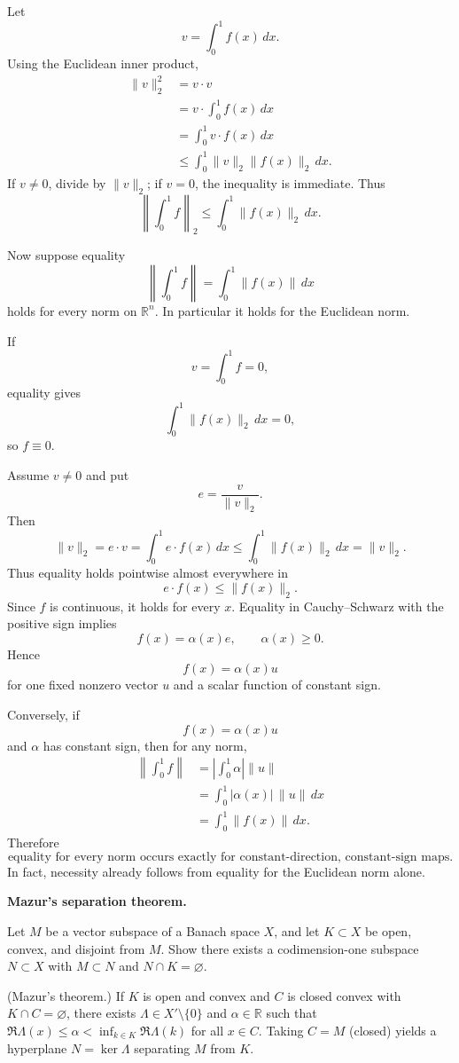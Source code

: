 \begin{solution}
Let
\[
v=\int_0^1 f(x)\,dx.
\]
Using the Euclidean inner product,
\[
\begin{aligned}
\|v\|_2^2
&=
v\cdot v\\
&=
v\cdot\int_0^1f(x)\,dx\\
&=
\int_0^1v\cdot f(x)\,dx\\
&\le
\int_0^1\|v\|_2\|f(x)\|_2\,dx.
\end{aligned}
\]
If \(v\neq0\), divide by \(\|v\|_2\); if \(v=0\), the inequality is immediate. Thus
\[
\boxed{
\left\|
\int_0^1f
\right\|_2
\le
\int_0^1\|f(x)\|_2\,dx.
}
\]

Now suppose equality
\[
\left\|
\int_0^1f
\right\|
=
\int_0^1\|f(x)\|\,dx
\]
holds for every norm on \(\mathbb R^n\). In particular it holds for the Euclidean norm.

If
\[
v=\int_0^1f=0,
\]
equality gives
\[
\int_0^1\|f(x)\|_2\,dx=0,
\]
so \(f\equiv0\).

Assume \(v\neq0\) and put
\[
e=\frac{v}{\|v\|_2}.
\]
Then
\[
\|v\|_2
=
e\cdot v
=
\int_0^1e\cdot f(x)\,dx
\le
\int_0^1\|f(x)\|_2\,dx
=
\|v\|_2.
\]
Thus equality holds pointwise almost everywhere in
\[
e\cdot f(x)\le\|f(x)\|_2.
\]
Since \(f\) is continuous, it holds for every \(x\). Equality in Cauchy--Schwarz with the
positive sign implies
\[
f(x)=\alpha(x)e,
\qquad
\alpha(x)\ge0.
\]
Hence
\[
\boxed{
f(x)=\alpha(x)u
}
\]
for one fixed nonzero vector \(u\) and a scalar function of constant sign.

Conversely, if
\[
f(x)=\alpha(x)u
\]
and \(\alpha\) has constant sign, then for any norm,
\[
\begin{aligned}
\left\|
\int_0^1f
\right\|
&=
\left|
\int_0^1\alpha
\right|
\|u\|\\
&=
\int_0^1|\alpha(x)|\,\|u\|\,dx\\
&=
\int_0^1\|f(x)\|\,dx.
\end{aligned}
\]
Therefore
\[
\boxed{
\text{equality for every norm occurs exactly for constant-direction, constant-sign maps}.
}
\]
In fact, necessity already follows from equality for the Euclidean norm alone.
\end{solution}


\begin{problem}[CP-II-0481]
\label{prob:cp-ii-0481}
\textbf{Mazur's separation theorem.}

\hspace*{1.5em}Let $M$ be a vector subspace of a Banach space $X$, and let $K\subset X$ be open, convex, and disjoint from $M$.
	Show there exists a codimension-one subspace $N\subset X$ with $M\subset N$ and $N\cap K=\varnothing$.

	(Mazur's theorem.) If $K$ is open and convex and $C$ is closed convex with $K\cap C=\varnothing$,
	there exists $\Lambda\in X'\setminus\{0\}$ and $\alpha\in\mathbb R$ such that
	$\Re\Lambda(x)\le \alpha<\inf_{k\in K}\Re\Lambda(k)$ for all $x\in C$.
	Taking $C=M$ (closed) yields a hyperplane $N=\ker\Lambda$ separating $M$ from $K$.
\end{problem}

